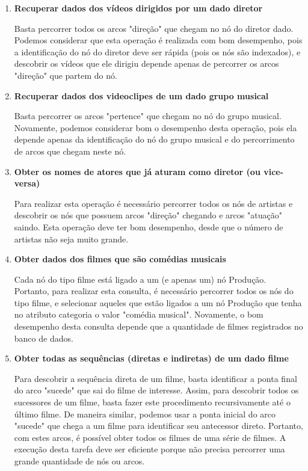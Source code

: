 \documentclass[12pt]{article}
\begin{document}
\begin{enumerate}
    \item{\bf Recuperar dados dos vídeos dirigidos por um dado diretor}
        
        Basta percorrer todos os arcos "direção" que chegam no nó do
        diretor dado. Podemos considerar que esta operação é realizada
        com bom desempenho, pois a identificação do nó do diretor deve
        ser rápida (pois os nós são indexados), e descobrir os vídeos
        que ele dirigiu depende apenas de percorrer os arcos "direção"
        que partem do nó.

    \item{\bf Recuperar dados dos videoclipes de um dado grupo musical}

        Basta percorrer os arcos "pertence" que chegam no nó do grupo
        musical. Novamente, podemos considerar bom o desempenho desta
        operação, pois ela depende apenas da identificação do nó do
        grupo musical e do percorrimento de arcos que chegam neste nó.

    \item{\bf Obter os nomes de atores que já aturam como diretor (ou 
        vice-versa)}

        Para realizar esta operação é necessário percorrer todos os nós 
        de artistas e descobrir os nós que possuem arcos "direção" 
        chegando e arcos "atuação" saindo. Esta operação deve ter bom
        desempenho, desde que o número de artistas não seja muito 
        grande.

    \item{\bf Obter dados dos filmes que são comédias musicais}
        
        Cada nó do tipo filme está ligado a um (e apenas um) nó 
        Produção. Portanto, para realizar esta consulta, é necessário 
        percorrer todos os nós do tipo filme, e selecionar aqueles que
        estão ligados a um nó Produção que tenha no atributo 
        {\ttfamily categoria} o valor "comédia musical". Novamente,
        o bom desempenho desta consulta depende que a quantidade de 
        filmes registrados no banco de dados.

    \item{\bf Obter todas as sequências (diretas e indiretas) de um dado 
        filme}
        
        Para descobrir a sequência direta de um filme, basta identificar
        a ponta final do arco "sucede" que sai do filme de interesse.
        Assim, para descobrir todos os sucessores de um filme, basta 
        fazer este procedimento recursivamente até o último filme. De 
        maneira similar, podemos usar a ponta inicial do arco "sucede" 
        que chega a um filme para identificar seu antecessor direto.  
        Portanto, com estes arcos, é possível obter todos os filmes de 
        uma série de filmes. A execução desta tarefa deve ser eficiente
        porque não precisa percorrer uma grande quantidade de nós ou 
        arcos.


\end{enumerate}
\end{document}
